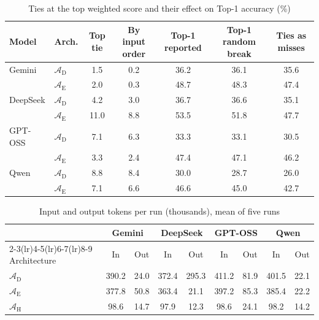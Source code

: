 \begin{table}[htbp]
\centering
\footnotesize
\caption{Ties at the top weighted score and their effect on Top-1 accuracy (\%)}
\label{tab:top_ties}
\renewcommand{\arraystretch}{1.15}
\setlength{\tabcolsep}{4pt}
\begin{tabular}{ll ccccc}
\toprule
Model & Arch. & Top tie & By input order & Top-1 reported & Top-1 random break & Ties as misses \\
\midrule
Gemini & $\mathcal{A}_{\text{D}}$ & 1.5 & 0.2 & 36.2 & 36.1 & 35.6 \\
 & $\mathcal{A}_{\text{E}}$ & 2.0 & 0.3 & 48.7 & 48.3 & 47.4 \\
DeepSeek & $\mathcal{A}_{\text{D}}$ & 4.2 & 3.0 & 36.7 & 36.6 & 35.1 \\
 & $\mathcal{A}_{\text{E}}$ & 11.0 & 8.8 & 53.5 & 51.8 & 47.7 \\
GPT-OSS & $\mathcal{A}_{\text{D}}$ & 7.1 & 6.3 & 33.3 & 33.1 & 30.5 \\
 & $\mathcal{A}_{\text{E}}$ & 3.3 & 2.4 & 47.4 & 47.1 & 46.2 \\
Qwen & $\mathcal{A}_{\text{D}}$ & 8.8 & 8.4 & 30.0 & 28.7 & 26.0 \\
 & $\mathcal{A}_{\text{E}}$ & 7.1 & 6.6 & 46.6 & 45.0 & 42.7 \\
\bottomrule
\end{tabular}
\setlength{\tabcolsep}{6pt}
\renewcommand{\arraystretch}{1.0}
\end{table}

\begin{table}[htbp]
\centering
\footnotesize
\caption{Input and output tokens per run (thousands), mean of five runs}
\label{tab:tokens_in_out}
\renewcommand{\arraystretch}{1.15}
\setlength{\tabcolsep}{4pt}
\begin{tabular}{l cc cc cc cc}
\toprule
 & \multicolumn{2}{c}{Gemini} & \multicolumn{2}{c}{DeepSeek} & \multicolumn{2}{c}{GPT-OSS} & \multicolumn{2}{c}{Qwen} \\
\cmidrule(lr){2-3}\cmidrule(lr){4-5}\cmidrule(lr){6-7}\cmidrule(lr){8-9}
Architecture & In & Out & In & Out & In & Out & In & Out \\
\midrule
$\mathcal{A}_{\text{D}}$ & 390.2 & 24.0 & 372.4 & 295.3 & 411.2 & 81.9 & 401.5 & 22.1 \\
$\mathcal{A}_{\text{E}}$ & 377.8 & 50.8 & 363.4 & 21.1 & 397.2 & 85.3 & 385.4 & 22.2 \\
$\mathcal{A}_{\text{H}}$ & 98.6 & 14.7 & 97.9 & 12.3 & 98.6 & 24.1 & 98.2 & 14.2 \\
\bottomrule
\end{tabular}
\setlength{\tabcolsep}{6pt}
\renewcommand{\arraystretch}{1.0}
\end{table}

